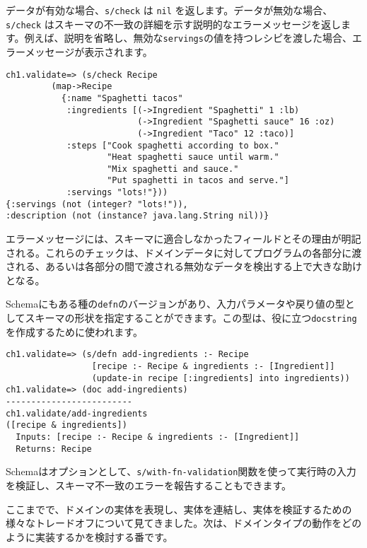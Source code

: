 データが有効な場合、\texttt{s/check} は \texttt{nil} を返します。データが無効な場合、\texttt{s/check} はスキーマの不一致の詳細を示す説明的なエラーメッセージを返します。例えば、説明を省略し、無効な\texttt{servings}の値を持つレシピを渡した場合、エラーメッセージが表示されます。

\begin{lstlisting}[numbers=none]
ch1.validate=> (s/check Recipe
         (map->Recipe
           {:name "Spaghetti tacos"
            :ingredients [(->Ingredient "Spaghetti" 1 :lb)
                          (->Ingredient "Spaghetti sauce" 16 :oz)
                          (->Ingredient "Taco" 12 :taco)]
            :steps ["Cook spaghetti according to box."
                    "Heat spaghetti sauce until warm."
                    "Mix spaghetti and sauce."
                    "Put spaghetti in tacos and serve."]
            :servings "lots!"}))
{:servings (not (integer? "lots!")),
:description (not (instance? java.lang.String nil))}
\end{lstlisting}

エラーメッセージには、スキーマに適合しなかったフィールドとその理由が明記される。これらのチェックは、ドメインデータに対してプログラムの各部分に渡される、あるいは各部分の間で渡される無効なデータを検出する上で大きな助けとなる。

Schemaにもある種の\texttt{defn}のバージョンがあり、入力パラメータや戻り値の型としてスキーマの形状を指定することができます。この型は、役に立つ\texttt{docstring}を作成するために使われます。

\begin{lstlisting}[numbers=none]
ch1.validate=> (s/defn add-ingredients :- Recipe
                 [recipe :- Recipe & ingredients :- [Ingredient]]
                 (update-in recipe [:ingredients] into ingredients))
ch1.validate=> (doc add-ingredients)
-------------------------
ch1.validate/add-ingredients
([recipe & ingredients])
  Inputs: [recipe :- Recipe & ingredients :- [Ingredient]]
  Returns: Recipe
\end{lstlisting}

Schemaはオプションとして、\texttt{s/with-fn-validation}関数を使って実行時の入力を検証し、スキーマ不一致のエラーを報告することもできます。

ここまでで、ドメインの実体を表現し、実体を連結し、実体を検証するための様々なトレードオフについて見てきました。次は、ドメインタイプの動作をどのように実装するかを検討する番です。

